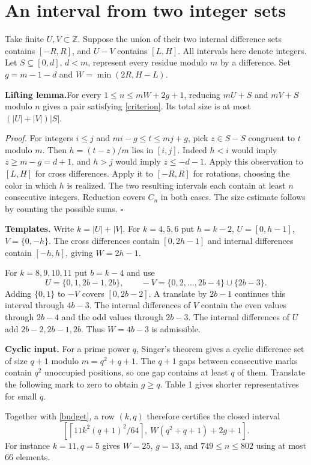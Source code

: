 \documentclass[11pt]{article}
\newcommand{\Z}{\mathbb Z}
\begin{document}
\newpage
\section{An interval from two integer sets}
Take finite $U,V\subset\Z$. Suppose the union of their two internal difference sets contains $[-R,R]$, and $U-V$ contains $[L,H]$. All intervals here denote integers. Let $S\subseteq[0,d]$, $d<m$, represent every residue modulo $m$ by a difference. Set $g=m-1-d$ and $W=\min(2R,H-L)$.

\textbf{Lifting lemma.}\quad For every $1\le n\le mW+2g+1$, reducing $mU+S$ and $mV+S$ modulo $n$ gives a pair satisfying \eqref{criterion}. Its total size is at most $(|U|+|V|)|S|$.

\textit{Proof.} For integers $i\le j$ and $mi-g\le t\le mj+g$, pick $z\in S-S$ congruent to $t$ modulo $m$. Then $h=(t-z)/m$ lies in $[i,j]$. Indeed $h<i$ would imply $z\ge m-g=d+1$, and $h>j$ would imply $z\le-d-1$. Apply this observation to $[L,H]$ for cross differences. Apply it to $[-R,R]$ for rotations, choosing the color in which $h$ is realized. The two resulting intervals each contain at least $n$ consecutive integers. Reduction covers $C_n$ in both cases. The size estimate follows by counting the possible sums. \hfill$\square$

\textbf{Templates.} Write $k=|U|+|V|$. For $k=4,5,6$ put $h=k-2$, $U=[0,h-1]$, $V=\{0,-h\}$. The cross differences contain $[0,2h-1]$ and internal differences contain $[-h,h]$, giving $W=2h-1$.

For $k=8,9,10,11$ put $b=k-4$ and use
\[
 U=\{0,1,2b-1,2b\},\qquad -V=\{0,2,\ldots,2b-4\}\cup\{2b-3\}.
\]
Adding $\{0,1\}$ to $-V$ covers $[0,2b-2]$. A translate by $2b-1$ continues this interval through $4b-3$. The internal differences of $V$ contain the even values through $2b-4$ and the odd values through $2b-3$. The internal differences of $U$ add $2b-2,2b-1,2b$. Thus $W=4b-3$ is admissible.

\textbf{Cyclic input.} For a prime power $q$, Singer's theorem \cite{Singer} gives a cyclic difference set of size $q+1$ modulo $m=q^2+q+1$. The $q+1$ gaps between consecutive marks contain $q^2$ unoccupied positions, so one gap contains at least $q$ of them. Translate the following mark to zero to obtain $g\ge q$. Table 1 gives shorter representatives for small $q$.

Together with \eqref{budget}, a row $(k,q)$ therefore certifies the closed interval
\begin{equation}
\left[\left\lceil11k^2(q+1)^2/64\right\rceil,\ W(q^2+q+1)+2g+1\right]. \label{interval}
\end{equation}
For instance $k=11,q=5$ gives $W=25$, $g=13$, and $749\le n\le802$ using at most 66 elements.
\end{document}
